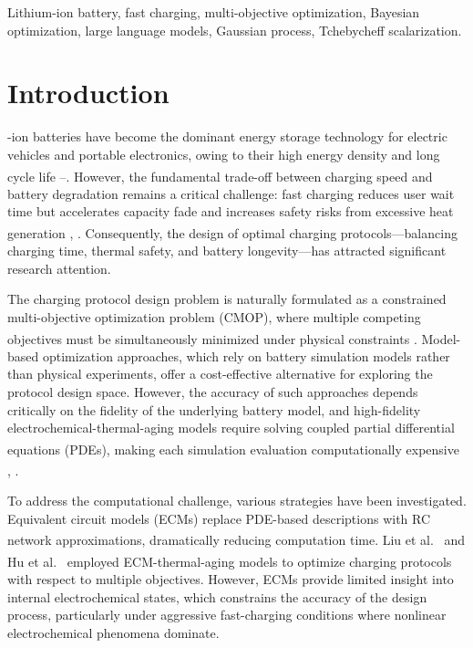 \documentclass[lettersize,journal]{IEEEtran}
\let\OLDcite\cite
\renewcommand{\cite}[1]{\textsuperscript{\OLDcite{#1}}}
\begin{document}
\begin{IEEEkeywords}
Lithium-ion battery, fast charging, multi-objective optimization, Bayesian optimization, large language models, Gaussian process, Tchebycheff scalarization.
\end{IEEEkeywords}

\section{Introduction}
-ion batteries have become the dominant energy storage technology for electric vehicles and portable electronics, owing to their high energy density and long cycle life \cite{ref1}--\cite{ref3}. However, the fundamental trade-off between charging speed and battery degradation remains a critical challenge: fast charging reduces user wait time but accelerates capacity fade and increases safety risks from excessive heat generation \cite{ref4}, \cite{ref5}. Consequently, the design of optimal charging protocols---balancing charging time, thermal safety, and battery longevity---has attracted significant research attention.

The charging protocol design problem is naturally formulated as a constrained multi-objective optimization problem (CMOP), where multiple competing objectives must be simultaneously minimized under physical constraints \cite{ref6}. Model-based optimization approaches, which rely on battery simulation models rather than physical experiments, offer a cost-effective alternative for exploring the protocol design space. However, the accuracy of such approaches depends critically on the fidelity of the underlying battery model, and high-fidelity electrochemical-thermal-aging models require solving coupled partial differential equations (PDEs), making each simulation evaluation computationally expensive \cite{ref7}, \cite{ref8}.

To address the computational challenge, various strategies have been investigated. Equivalent circuit models (ECMs) replace PDE-based descriptions with RC network approximations, dramatically reducing computation time. Liu et al.\ \cite{ref10} and Hu et al.\ \cite{ref11} employed ECM-thermal-aging models to optimize charging protocols with respect to multiple objectives. However, ECMs provide limited insight into internal electrochemical states, which constrains the accuracy of the design process, particularly under aggressive fast-charging conditions where nonlinear electrochemical phenomena dominate.
\end{document}
